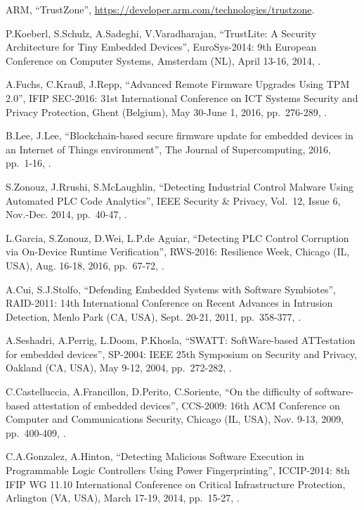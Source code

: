\begin{thebibliography}{99}
ARM,
``TrustZone'',
\url{https://developer.arm.com/technologies/trustzone}.

P.Koeberl, S.Schulz, A.Sadeghi, V.Varadharajan,
``TrustLite: A Security Architecture for Tiny Embedded Devices'',
EuroSys-2014: 9th European Conference on Computer Systems,
Amsterdam (NL), April 13-16, 2014,
.

A.Fuchs, C.Krau{\ss}, J.Repp,
``Advanced Remote Firmware Upgrades Using TPM 2.0'',
IFIP SEC-2016: 31st International Conference on ICT Systems Security and Privacy Protection,
Ghent (Belgium), May 30-June 1, 2016,
pp.\ 276-289,
.

B.Lee, J.Lee,
``Blockchain-based secure firmware update for embedded devices in an Internet of Things environment'',
The Journal of Supercomputing, 2016,
pp.\ 1-16,
.

S.Zonouz, J.Rrushi, S.McLaughlin,
``Detecting Industrial Control Malware Using Automated PLC Code Analytics'',
IEEE Security \& Privacy,
Vol.\ 12, Issue 6,
Nov.-Dec. 2014,
pp.\ 40-47,
.

L.Garcia, S.Zonouz, D.Wei, L.P.de Aguiar,
``Detecting PLC Control Corruption via On-Device Runtime Verification'',
RWS-2016: Resilience Week,
Chicago (IL, USA), Aug. 16-18, 2016,
pp.\ 67-72,
.

A.Cui, S.J.Stolfo,
``Defending Embedded Systems with Software Symbiotes'',
RAID-2011: 14th International Conference on Recent Advances in Intrusion Detection,
Menlo Park (CA, USA), Sept. 20-21, 2011,
pp.\ 358-377,
.

A.Seshadri, A.Perrig, L.Doom, P.Khosla,
``SWATT: SoftWare-based ATTestation for embedded devices'',
SP-2004: IEEE 25th Symposium on Security and Privacy,
Oakland (CA, USA), May 9-12, 2004,
pp.\ 272-282,
.

C.Castelluccia, A.Francillon, D.Perito, C.Soriente,
``On the difficulty of software-based attestation of embedded devices'',
CCS-2009: 16th ACM Conference on Computer and Communications Security,
Chicago (IL, USA), Nov. 9-13, 2009,
pp.\ 400-409,
.

C.A.Gonzalez, A.Hinton,
``Detecting Malicious Software Execution in Programmable Logic Controllers Using Power Fingerprinting'',
ICCIP-2014: 8th IFIP WG 11.10 International Conference on Critical Infrastructure Protection,
Arlington (VA, USA), March 17-19, 2014,
pp.\ 15-27,
.


\end{thebibliography}
